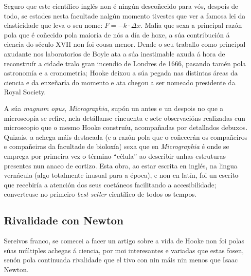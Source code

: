 \begin{refsection}
\begin{multicols}{2}
Seguro que este científico inglés non é ningún descoñecido para vós, despois de
todo, se estades nesta facultade nalgún momento tivestes que ver a famosa lei
da elasticidade que leva o seu nome: $F= -k\cdot\Delta x$. Malia que sexa a
principal razón pola que é coñecido pola maioría de nós a día de hoxe, a súa
contribución á ciencia do século XVII non foi cousa menor. Dende o seu traballo
como principal axudante nos laboratorios de Boyle ata a súa inestimable axuda á
hora de reconstruír a cidade tralo gran incendio de Londres de 1666, pasando tamén pola astronomía e a cronometría; Hooke deixou a súa pegada nas distintas áreas da ciencia e da enxeñaría do momento e ata chegou a ser nomeado presidente da Royal Society.

A súa \textit{magnum opus}, \textit{Micrographia}, supón un antes e un despois
no que a microscopía se refire, nela detállanse cincuenta e sete observacións
realizadas cun microscopio que o mesmo Hooke construíu, acompañadas por
detallados debuxos. Quizais, a achega máis destacada (e a razón pola que o
coñecerán os compañeiros e compañeiras da facultade de bioloxía) sexa que en
\textit{Micrographia} é onde se emprega por primeira vez o término ``célula''
ao describir unhas estruturas presentes nun anaco de cortizo. Esta obra, ao
estar escrita en inglés, na lingua vernácula (algo totalmente inusual para a
época), e non en latín, foi un escrito que recebiría a atención dos seus
coetáneos facilitando a accesibilidade; converteuse no primeiro \textit{best
seller} científico de todos os tempos.

\subsection*{Rivalidade con Newton}

Sereivos franco, se comecei a facer un artigo sobre a vida de Hooke non foi
polas súas múltiples achegas á ciencia, por moi interesantes e variadas que
estas fosen, senón pola continuada rivalidade que el tivo con nin máis nin
menos que Isaac Newton.


\end{multicols}
\end{refsection}
